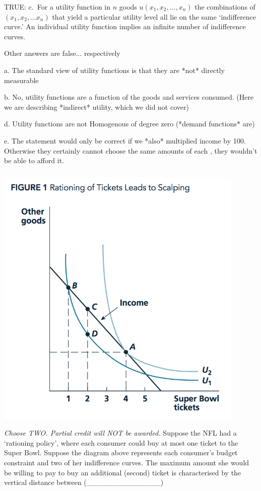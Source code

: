 \documentclass[]{article}
\begin{document}
TRUE: c.~For a utility function in \(n\) goods \(u(x_1,x_2,...,x_n)\)
the combinations of \((x_1,x_2,...x_n)\) that yield a particular utility
level all lie on the same `indifference curve.' An individual utility
function implies an infinite number of indifference curves.

Other answers are false... respectively

a. The standard view of utility functions is that they are *not*
directly measurable

b. No, utility functions are a function of the goods and services
consumed. (Here we are describing *indirect* utility, which we did not
cover)

d. Utility functions are not Homogenous of degree zero (*demand
functions* are)

e. The statement would only be correct if we *also* multiplied income by
100. Otherwise they certainly cannot choose the same amounts of each ,
they wouldn't be able to afford it.

\hypertarget{section-4}{%
\subsubsection{}\label{section-4}}

\includegraphics[width=\textwidth,height=5in]{../picsfigs/scalping.png}

{\emph{Choose TWO. Partial credit will NOT be awarded.}} Suppose the NFL
had a `rationing policy', where each consumer could buy at most one
ticket to the Super Bowl. Suppose the diagram above represents each
consumer's budget constraint and two of her indifference curves. The
maximum amount she would be willing to pay to buy an additional (second)
ticket is characterised by the vertical distance between
(\_\_\_\_\_\_\_\_\_\_\_\_\_\_)
\end{document}
